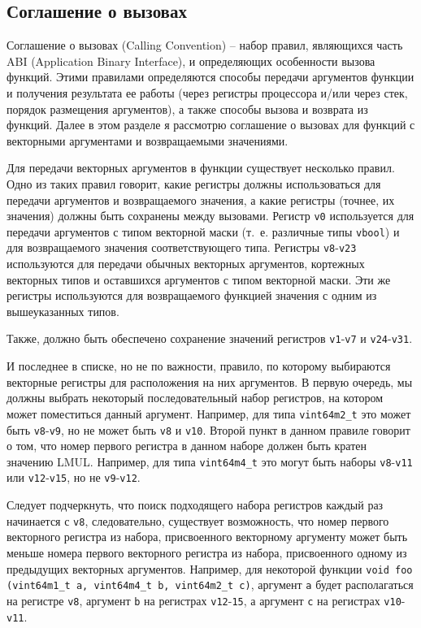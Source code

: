 \subsection {Соглашение о вызовах}
\label{riscv:callconv}

Соглашение о вызовах (Calling Convention) -- набор правил, являющихся часть ABI (Application
Binary Interface), и определяющих особенности вызова функций. Этими правилами определяются
способы передачи аргументов функции и получения результата ее работы (через регистры процессора 
и/или через стек, порядок размещения аргументов), а также способы вызова и возврата из функций.
Далее в этом разделе я рассмотрю соглашение о вызовах для функций с векторными аргументами и
возвращаемыми значениями.

Для передачи векторных аргументов в функции существует несколько правил. Одно из таких правил
говорит, какие регистры должны использоваться для передачи аргументов и возвращаемого значения,
а какие регистры (точнее, их значения) должны быть сохранены между вызовами.
Регистр \texttt{v0} используется для передачи аргументов с типом векторной маски (т.~е. различные 
типы \texttt{vbool}) и для возвращаемого значения соответствующего типа. Регистры \texttt{v8}-\texttt{v23}
используются для передачи обычных векторных аргументов, кортежных векторных типов и оставшихся
аргументов с типом векторной маски. Эти же регистры используются для возвращаемого функцией
значения с одним из вышеуказанных типов.

Также, должно быть обеспечено сохранение значений регистров \texttt{v1}-\texttt{v7} и
\texttt{v24}-\texttt{v31}.

И последнее в списке, но не по важности, правило, по которому выбираются векторные регистры для
расположения на них аргументов. В первую очередь, мы должны выбрать некоторый последовательный
набор регистров, на котором может поместиться данный аргумент. Например, для типа \texttt{vint64m2\_t}
это может быть \texttt{v8}-\texttt{v9}, но не может быть \texttt{v8} и \texttt{v10}. Второй пункт
в данном правиле говорит о том, что номер первого регистра в данном наборе должен быть кратен значению
LMUL. Например, для типа \texttt{vint64m4\_t} это могут быть наборы \texttt{v8}-\texttt{v11} или
\texttt{v12}-\texttt{v15}, но не \texttt{v9}-\texttt{v12}.

Следует подчеркнуть, что поиск подходящего набора регистров каждый раз начинается с \texttt{v8},
следовательно, существует возможность, что номер первого векторного регистра из набора,
присвоенного векторному аргументу может быть меньше номера первого векторного регистра из набора,
присвоенного одному из предыдущих векторных аргументов. Например, для некоторой функции \texttt{void
foo (vint64m1\_t a, vint64m4\_t b, vint64m2\_t c)}, аргумент \texttt{a} будет располагаться на 
регистре \texttt{v8}, аргумент \texttt{b} на регистрах \texttt{v12}-\texttt{15}, а аргумент \texttt{c}
на регистрах \texttt{v10}-\texttt{v11}. 

\newpage
